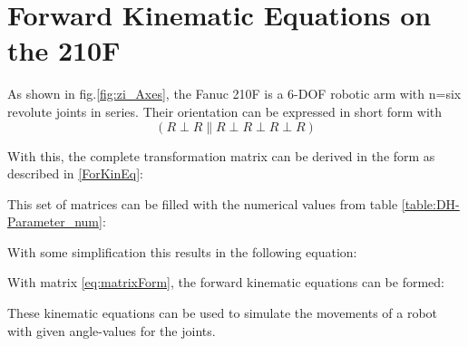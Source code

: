 \section{Forward Kinematic Equations on the 210F}
As shown in fig.\ref{fig:zi_Axes}, the Fanuc 210F is a 6-\ac{DOF} robotic arm with n=six revolute joints in series. 
Their orientation can be expressed in short form with 
\begin{equation}
	(R\perp R\parallel R\perp R\perp R\perp R )
\end{equation}

With this, the complete transformation matrix can be derived in the form as described in \ref{ForKinEq}:



This set of matrices can be filled with the numerical values from table \ref{table:DH-Parameter_num}:



With some simplification this results in the following equation:



With matrix \ref{eq:matrixForm}, the forward kinematic equations can be formed:




These kinematic equations can be used to simulate the movements of a robot with given angle-values for the joints. 

